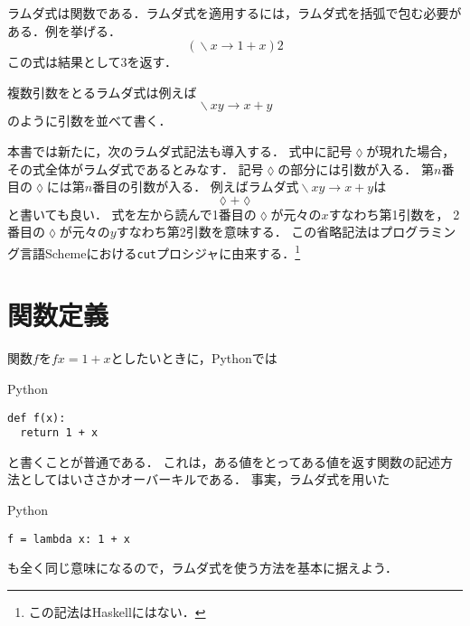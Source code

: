 \documentclass[a5paper,draft]{jsbook}
\newcommand{\programminglanguage}[1]{\textsf{#1}}
\newcommand{\haskell}{\programminglanguage{Haskell}}
\newcommand{\python}{\programminglanguage{Python}}
\newcommand{\scheme}{\programminglanguage{Scheme}}
\newcommand{\code}[1]{\texttt{#1}}
\newenvironment{pythoncode}{\begin{itembox}[r]{\python}}{\end{itembox}}
\newcommand{\mathAnonymousParameter}{\lozenge}
\DeclareMathOperator{\mathLambda}{\backslash}
\newcommand{\mathLambdaArrow}{\rightarrow}
\newcommand{\mathLambdaExpression}[2]{\mathLambda#1\mathLambdaArrow#2}
\begin{document}
ラムダ式は関数である．ラムダ式を適用するには，ラムダ式を括弧で包む必要がある．例を挙げる．
\begin{equation}
\left(\mathLambdaExpression{x}{1+x}\right)2
\end{equation}
この式は結果として$3$を返す．

複数引数をとるラムダ式は例えば
\begin{equation}
\mathLambdaExpression{xy}{x+y}
\end{equation}
のように引数を並べて書く．

本書では新たに，次のラムダ式記法も導入する．
式中に記号$\mathAnonymousParameter$が現れた場合，
その式全体がラムダ式であるとみなす．
記号$\mathAnonymousParameter$の部分には引数が入る．
第$n$番目の$\mathAnonymousParameter$には第$n$番目の引数が入る．
例えばラムダ式$\mathLambdaExpression{xy}{x+y}$は
\begin{equation}
\mathAnonymousParameter+\mathAnonymousParameter
\end{equation}
と書いても良い．
式を左から読んで1番目の$\mathAnonymousParameter$が元々の$x$すなわち第1引数を，
2番目の$\mathAnonymousParameter$が元々の$y$すなわち第2引数を意味する．
この省略記法はプログラミング言語\scheme における\code{cut}プロシジャに由来する．\footnote{この記法は\haskell にはない．}


\section{関数定義}

関数$f$を$fx=1+x$としたいときに，\python では
\begin{pythoncode}
\begin{verbatim}
def f(x):
  return 1 + x
\end{verbatim}
\end{pythoncode}
と書くことが普通である．
これは，ある値をとってある値を返す関数の記述方法としてはいささかオーバーキルである．
事実，ラムダ式を用いた
\begin{pythoncode}
\begin{verbatim}
f = lambda x: 1 + x
\end{verbatim}
\end{pythoncode}
も全く同じ意味になるので，ラムダ式を使う方法を基本に据えよう．
\end{document}
